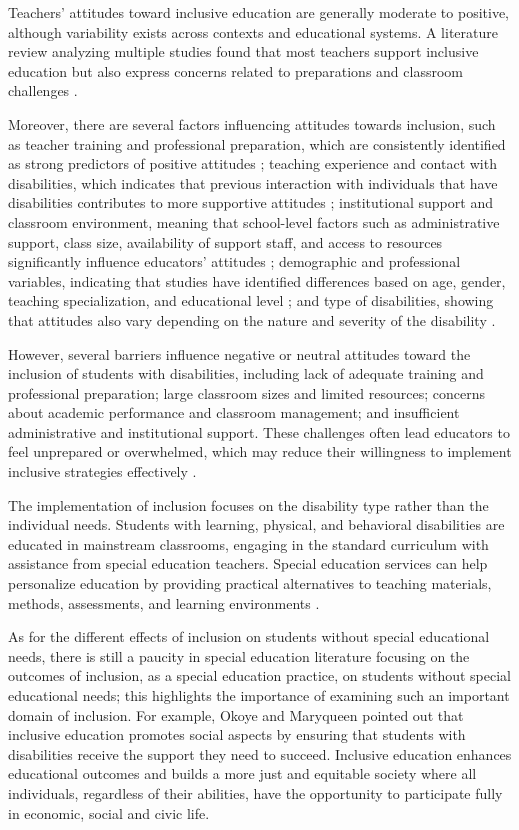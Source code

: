 \documentclass[10pt]{NSP1}
\begin{document}
	Teachers' attitudes toward inclusive education are generally moderate to positive, although variability exists across contexts and educational systems. A literature review analyzing multiple studies found that most teachers support inclusive education but also express concerns related to preparations and classroom challenges \cite{ref9}.

	Moreover, there are several factors influencing attitudes towards inclusion, such as teacher training and professional preparation, which are consistently identified as strong predictors of positive attitudes \cite{ref10}; teaching experience and contact with disabilities, which indicates that previous interaction with individuals that have disabilities contributes to more supportive attitudes \cite{ref11}; institutional support and classroom environment, meaning that school-level factors such as administrative support, class size, availability of support staff, and access to resources significantly influence educators' attitudes \cite{ref12}; demographic and professional variables, indicating that studies have identified differences based on age, gender, teaching specialization, and educational level \cite{ref11}; and type of disabilities, showing that attitudes also vary depending on the nature and severity of the disability \cite{ref13}.

	However, several barriers influence negative or neutral attitudes toward the inclusion of students with disabilities, including lack of adequate training and professional preparation; large classroom sizes and limited resources; concerns about academic performance and classroom management; and insufficient administrative and institutional support. These challenges often lead educators to feel unprepared or overwhelmed, which may reduce their willingness to implement inclusive strategies effectively \cite{ref14}.

	The implementation of inclusion focuses on the disability type rather than the individual needs. Students with learning, physical, and behavioral disabilities are educated in mainstream classrooms, engaging in the standard curriculum with assistance from special education teachers. Special education services can help personalize education by providing practical alternatives to teaching materials, methods, assessments, and learning environments \cite{ref15}.

	As for the different effects of inclusion on students without special educational needs, there is still a paucity in special education literature focusing on the outcomes of inclusion, as a special education practice, on students without special educational needs; this highlights the importance of examining such an important domain of inclusion. For example, Okoye and Maryqueen \cite{ref3} pointed out that inclusive education promotes social aspects by ensuring that students with disabilities receive the support they need to succeed. Inclusive education enhances educational outcomes and builds a more just and equitable society where all individuals, regardless of their abilities, have the opportunity to participate fully in economic, social and civic life.
\end{document}
